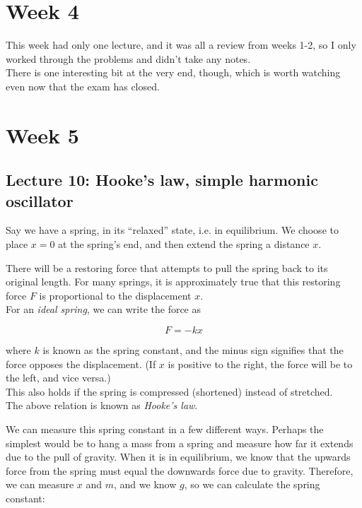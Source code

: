\documentclass[12pt,a4paper]{report}
\begin{document}
\chapter{Week 4}

This week had only one lecture, and it was all a review from weeks 1-2, so I only worked through the problems and didn't take any notes.\\
There is one interesting bit at the very end, though, which is worth watching even now that the exam has closed.

\chapter{Week 5}

\section{Lecture 10: Hooke's law, simple harmonic oscillator}

Say we have a spring, in its ``relaxed'' state, i.e. in equilibrium. We choose to place $x = 0$ at the spring's end, and then extend the spring a distance $x$.

There will be a restoring force that attempts to pull the spring back to its original length. For many springs, it is approximately true that this restoring force $F$ is proportional to the displacement $x$.\\
For an \emph{ideal spring}, we can write the force as

\begin{equation}
F = -k x
\end{equation}

where $k$ is known as the spring constant, and the minus sign signifies that the force opposes the displacement. (If $x$ is positive to the right, the force will be to the left, and vice versa.)\\
This also holds if the spring is compressed (shortened) instead of stretched.\\
The above relation is known as \emph{Hooke's law}.

We can measure this spring constant in a few different ways. Perhaps the simplest would be to hang a mass from a spring and measure how far it extends due to the pull of gravity. When it is in equilibrium, we know that the upwards force from the spring must equal the downwards force due to gravity. Therefore, we can measure $x$ and $m$, and we know $g$, so we can calculate the spring constant:
\end{document}
